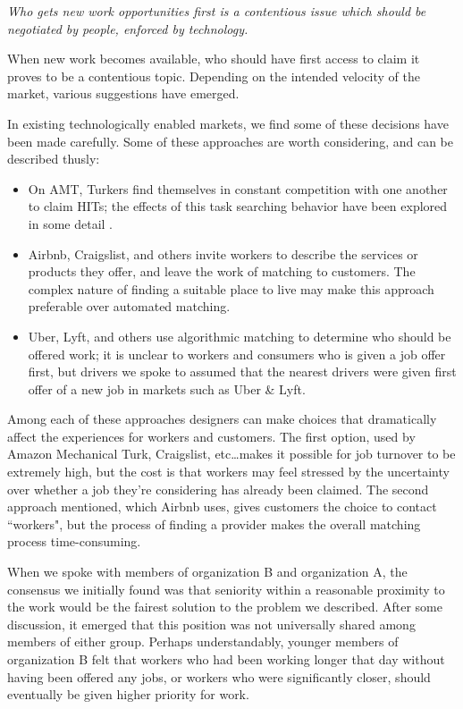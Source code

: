 \textit{Who gets new work opportunities first is a contentious issue which should be negotiated by people, enforced by technology.}

When new work becomes available, who should have first access to claim it proves to be a contentious topic.
Depending on the intended velocity of the market, various suggestions have emerged.

In existing technologically enabled markets, we find some of these decisions have been made carefully.
Some of these approaches are worth considering, and can be described thusly:
\begin{itemize} \itemsep0pt \parskip0pt
  \item On AMT, Turkers find themselves in constant competition with one another to claim HITs;
  the effects of this task searching behavior have been explored in some detail \cite{taskSearch}.
  \item Airbnb, Craigslist, and others invite workers to describe the services or products they offer, and leave the work of matching to customers.
  The complex nature of finding a suitable place to live may make this approach preferable over automated matching.
  \item Uber, Lyft, and others use algorithmic matching to determine who should be offered work;
  it is unclear to workers and consumers who is given a job offer first,
  but drivers we spoke to assumed that the nearest drivers were given first offer of a new job in markets such as Uber \& Lyft.
\end{itemize}

Among each of these approaches designers can make choices that dramatically affect the experiences for workers and customers.
The first option, used by Amazon Mechanical Turk, Craigslist, etc\dots makes it possible for job turnover to be extremely high, but the cost is that workers may feel stressed by the uncertainty over whether a job they're considering has already been claimed.
The second approach mentioned, which Airbnb uses, gives customers the choice to contact ``workers", but the process of finding a provider makes the overall matching process time-consuming.

When we spoke with members of organization B and organization A,
the consensus we initially found was that seniority within a reasonable proximity to the work would be the fairest solution to the problem we described.
After some discussion, it emerged that this position was not universally shared among members of either group.
Perhaps understandably, younger members of organization B felt that workers who had been working longer that day without having been offered any jobs,
or workers who were significantly closer, should eventually be given higher priority for work.

